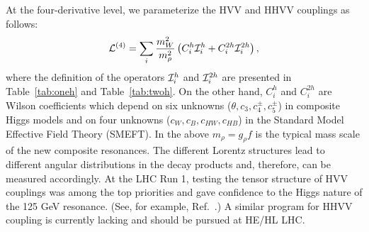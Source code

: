 At the four-derivative level, we parameterize the HVV and HHVV couplings  as follows:
\begin{equation}
\label{eq:Cis}
{\cal L}^{(4)} =  \sum_i\frac{m_W^2}{m_\rho^2} \left(C^h_i {\cal I}^h_i  +C^{2h}_i {\cal I}^{2h}_i\right) ,
\end{equation}
where the definition of the  operators ${\cal I}^h_i$ and ${\cal I}^{2h}_i$ are presented in Table~\ref{tab:oneh} and Table~\ref{tab:twoh}. On the other hand, $C^h_i$ and $C^{2h}_i$ are Wilson coefficients which depend on six unknowns ($\theta, c_3, c_4^\pm, c_5^\pm$) in composite Higgs models and on four unknowns ($c_W, c_B, c_{HW}, c_{HB}$)  in the Standard Model Effective Field Theory (SMEFT). In the above $m_\rho=g_\rho f$ is the typical mass scale of the new composite resonances. The different Lorentz structures lead to different angular distributions in the decay products and, therefore, can be measured accordingly. At the LHC Run 1,  testing the tensor structure of HVV couplings was among the top priorities and gave confidence to the Higgs nature of the 125 GeV resonance. (See, for example, Ref.~\cite{Sirunyan:2017tqd}.) A similar program for HHVV coupling is currently lacking and should be pursued at HE/HL LHC.

